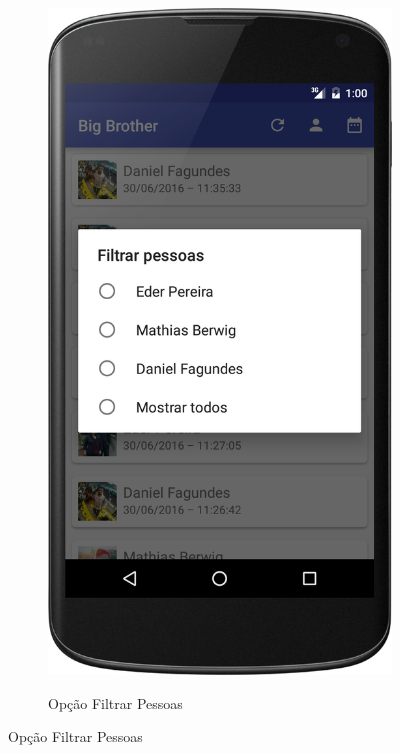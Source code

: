 \begin{figure}
\begin{subfigure}{.5\textwidth}
	\label{android_tela_inicial}
\end{subfigure}%
\begin{subfigure}{.5\textwidth}
	\centering
	\caption{Opção Filtrar Pessoas}
	\includegraphics[scale=0.2]{imagens/android_filtrar_pessoas.png}
	\label{android_filtrar_pessoas}
\end{subfigure}

\end{figure}
